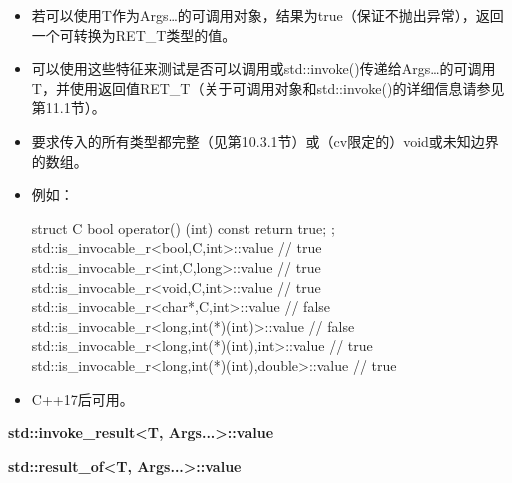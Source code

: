 \begin{itemize}
\item 
若可以使用T作为Args…的可调用对象，结果为true（保证不抛出异常），返回一个可转换为RET\_T类型的值。

\item 
可以使用这些特征来测试是否可以调用或std::invoke()传递给Args…的可调用T，并使用返回值RET\_T（关于可调用对象和std::invoke()的详细信息请参见第11.1节）。

\item 
要求传入的所有类型都完整（见第10.3.1节）或（cv限定的）void或未知边界的数组。

\item 
例如：
\begin{cpp}
struct C {
	bool operator() (int) const {
		return true;
	}
};
std::is_invocable_r<bool,C,int>::value // true
std::is_invocable_r<int,C,long>::value // true
std::is_invocable_r<void,C,int>::value // true
std::is_invocable_r<char*,C,int>::value // false
std::is_invocable_r<long,int(*)(int)>::value // false
std::is_invocable_r<long,int(*)(int),int>::value // true
std::is_invocable_r<long,int(*)(int),double>::value // true
\end{cpp}

\item 
C++17后可用。
\end{itemize}

\textbf{std::invoke\_result<T, Args...>::value}

\textbf{std::result\_of<T, Args...>::value}

